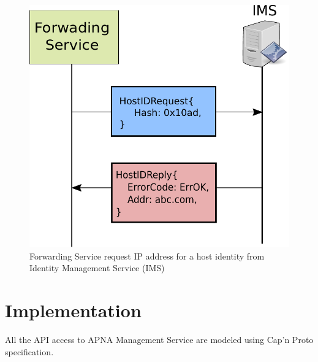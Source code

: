 \begin{figure}[th!]
\centering
\includegraphics[scale=0.6]{Figures/siphash.pdf}
\decoRule
\caption[Host Identity Service]{Forwarding Service request IP address for a host identity from Identity Management Service (IMS)}
\label{fig:ims_request}
\end{figure}

\section{Implementation}
All the API access to APNA Management Service are modeled using Cap’n Proto specification.